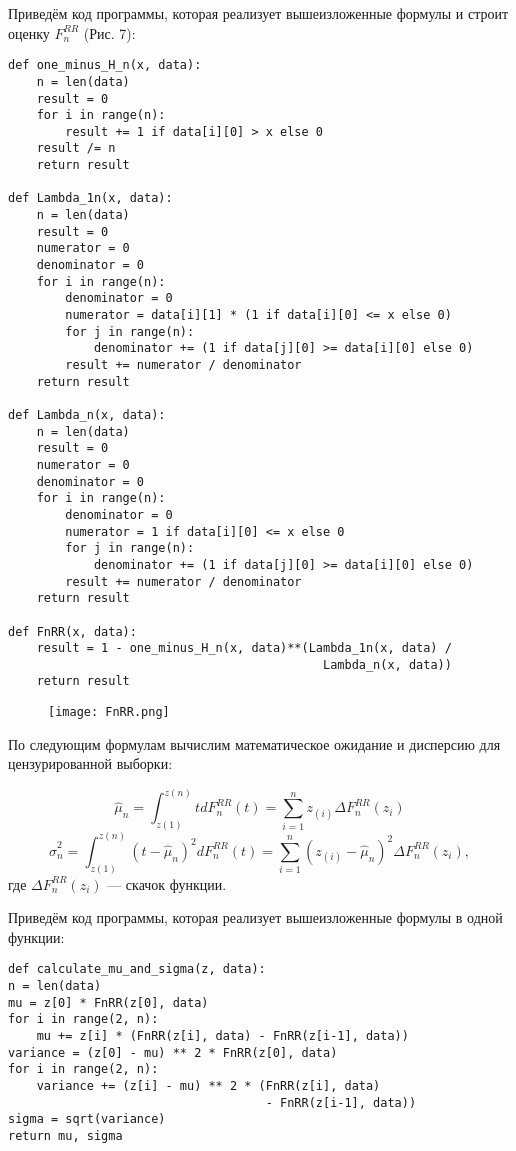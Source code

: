 Приведём код программы, которая реализует вышеизложенные формулы и строит оценку $F_n^{RR}$ (Рис. 7):
\begin{verbatim}
def one_minus_H_n(x, data):
    n = len(data)
    result = 0
    for i in range(n):
        result += 1 if data[i][0] > x else 0
    result /= n
    return result

def Lambda_1n(x, data):
    n = len(data)
    result = 0
    numerator = 0
    denominator = 0
    for i in range(n):
        denominator = 0
        numerator = data[i][1] * (1 if data[i][0] <= x else 0)
        for j in range(n):
            denominator += (1 if data[j][0] >= data[i][0] else 0)
        result += numerator / denominator
    return result

def Lambda_n(x, data):
    n = len(data)
    result = 0
    numerator = 0
    denominator = 0
    for i in range(n):
        denominator = 0
        numerator = 1 if data[i][0] <= x else 0
        for j in range(n):
            denominator += (1 if data[j][0] >= data[i][0] else 0)
        result += numerator / denominator
    return result

def FnRR(x, data):
    result = 1 - one_minus_H_n(x, data)**(Lambda_1n(x, data) /
                                            Lambda_n(x, data))
    return result
\end{verbatim}

\begin{figure}[h]
    \begin{center}
        \texttt{[image: FnRR.png]}
        \caption{}
        \label{ris:experimcoded}
    \end{center}
\end{figure}

По следующим формулам вычислим математическое ожидание и дисперсию для цензурированной выборки:

$$\hat{\mu}_n = \int_{z(1)}^{z(n)} tdF_n^{RR} (t) = \sum_{i=1}^{n} z_{(i)} \Delta F_n^{RR} (z_i) $$
$$\hat{\sigma}_n^2 = \int_{z(1)}^{z(n)} (t - \hat{\mu}_n)^2 dF_n^{RR} (t) = \sum_{i=1}^{n} (z_{(i)} - \hat{\mu}_n)^2 \Delta F_n^{RR} (z_i),$$
где $\Delta F_n^{RR} (z_i)$ --- скачок функции.

Приведём код программы, которая реализует вышеизложенные формулы в одной функции:
\begin{verbatim}
def calculate_mu_and_sigma(z, data):
n = len(data)
mu = z[0] * FnRR(z[0], data)
for i in range(2, n):
    mu += z[i] * (FnRR(z[i], data) - FnRR(z[i-1], data))
variance = (z[0] - mu) ** 2 * FnRR(z[0], data)
for i in range(2, n):
    variance += (z[i] - mu) ** 2 * (FnRR(z[i], data)
                                    - FnRR(z[i-1], data))
sigma = sqrt(variance)
return mu, sigma
\end{verbatim}

